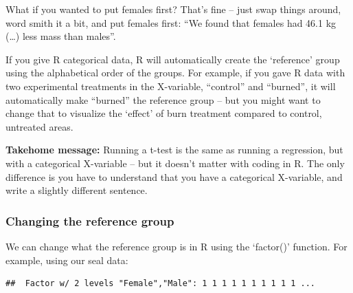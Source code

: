 \documentclass[
]{article}
\newenvironment{Shaded}{\begin{snugshade}}{\end{snugshade}}
\newcommand{\AttributeTok}[1]{\textcolor[rgb]{0.13,0.29,0.53}{#1}}
\newcommand{\CommentTok}[1]{\textcolor[rgb]{0.56,0.35,0.01}{\textit{#1}}}
\newcommand{\FunctionTok}[1]{\textcolor[rgb]{0.13,0.29,0.53}{\textbf{#1}}}
\newcommand{\NormalTok}[1]{#1}
\newcommand{\OtherTok}[1]{\textcolor[rgb]{0.56,0.35,0.01}{#1}}
\newcommand{\SpecialCharTok}[1]{\textcolor[rgb]{0.81,0.36,0.00}{\textbf{#1}}}
\newcommand{\StringTok}[1]{\textcolor[rgb]{0.31,0.60,0.02}{#1}}
\begin{document}
What if you wanted to put females first? That's fine -- just swap things
around, word smith it a bit, and put females first: ``We found that
females had 46.1 kg (\ldots) less mass than males''.

If you give R categorical data, R will automatically create the
`reference' group using the alphabetical order of the groups. For
example, if you gave R data with two experimental treatments in the
X-variable, ``control'' and ``burned'', it will automatically make
``burned'' the reference group -- but you might want to change that to
visualize the `effect' of burn treatment compared to control, untreated
areas.

\textbf{Takehome message:} Running a t-test is the same as running a
regression, but with a categorical X-variable -- but it doesn't matter
with coding in R. The only difference is you have to understand that you
have a categorical X-variable, and write a slightly different sentence.

\subsubsection{Changing the reference
group}\label{changing-the-reference-group}

We can change what the reference group is in R using the `factor()'
function. For example, using our seal data:

\begin{Shaded}
\end{Shaded}

\begin{verbatim}
##  Factor w/ 2 levels "Female","Male": 1 1 1 1 1 1 1 1 1 1 ...
\end{verbatim}

\begin{Shaded}
\end{Shaded}
\end{document}
